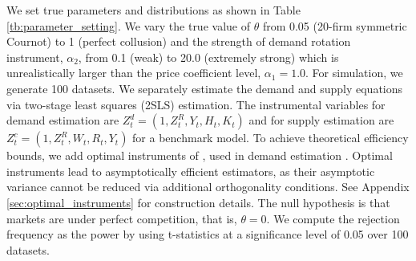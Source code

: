 \documentclass[11pt, a4paper]{article}
\begin{document}
We set true parameters and distributions as shown in Table \ref{tb:parameter_setting}. 
We vary the true value of $\theta$ from 0.05 (20-firm symmetric Cournot) to 1 (perfect collusion) and the strength of demand rotation instrument, $\alpha_2$, from 0.1 (weak) to 20.0 (extremely strong) which is unrealistically larger than the price coefficient level, $\alpha_1=1.0$.
For simulation, we generate 100 datasets.
We separately estimate the demand and supply equations via two-stage least squares (2SLS) estimation.
The instrumental variables for demand estimation are $Z^{d}_{t} = (1, Z^{R}_{t}, Y_{t}, H_{t}, K_{t})$ and for supply estimation are $Z^{c}_{t} = (1, Z^{R}_{t}, W_{t}, R_{t}, Y_{t})$ for a benchmark model. 
To achieve theoretical efficiency bounds, we add optimal instruments of \cite{chamberlain1987asymptotic}, used in demand estimation \citep{reynaert2014improving}. 
Optimal instruments lead to asymptotically efficient estimators, as their asymptotic variance cannot be reduced via additional orthogonality conditions.
See Appendix \ref{sec:optimal_instruments} for construction details.
The null hypothesis is that markets are under perfect competition, that is, $\theta=0$.
We compute the rejection
frequency as the power by using t-statistics at a significance level of 0.05 over 100 datasets.
\end{document}
